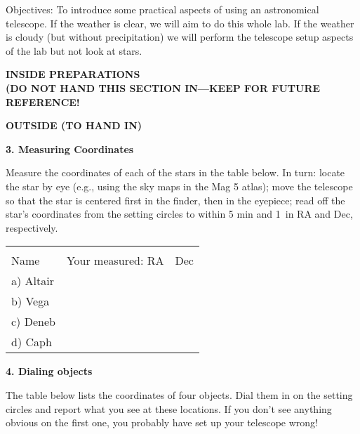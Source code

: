 
\noindent
{Objectives:} To introduce some practical aspects of using an
astronomical telescope. If the weather is clear, we will aim to do
this whole lab. If the weather is cloudy (but without precipitation)
we will perform the telescope setup aspects of the lab but not look at
stars.

\bigskip\noindent
{\bf INSIDE PREPARATIONS\\
(DO NOT HAND THIS SECTION IN---KEEP FOR FUTURE REFERENCE!}



\clearpage
\noindent
{\bf OUTSIDE (TO HAND IN)}

\bigskip\noindent
{\bf 3. Measuring Coordinates}

\medskip\noindent
Measure the coordinates of each of the stars in the table below. In
turn: locate the star by eye (e.g., using the sky maps in the Mag 5
atlas); move the telescope so that the star is centered first in the
finder, then in the eyepiece; read off the star's coordinates from the
setting circles to within 5 min and 1\deg\ in RA and Dec,
respectively.

\begin{center}
\begin{tabular}{lcc} \hline \\ [-6pt]
\hspace{1cm}Name\hspace{1cm} &  \hspace{1cm} Your measured:  RA \hspace{1cm} & Dec \\ [6pt]
\hline
a) Altair  & &     \\ \hline
b) Vega  & &  \\ \hline
c) Deneb  & &    \\ \hline
d) Caph  & &   \\ \hline
  \end{tabular}
\end{center}

\bigskip\noindent
{\bf 4. Dialing objects}

\bigskip\noindent The table below lists the coordinates of four
objects. Dial them in on the setting circles and report what you see
at these locations. If you don't see anything obvious on the first
one, you probably have set up your telescope wrong!

